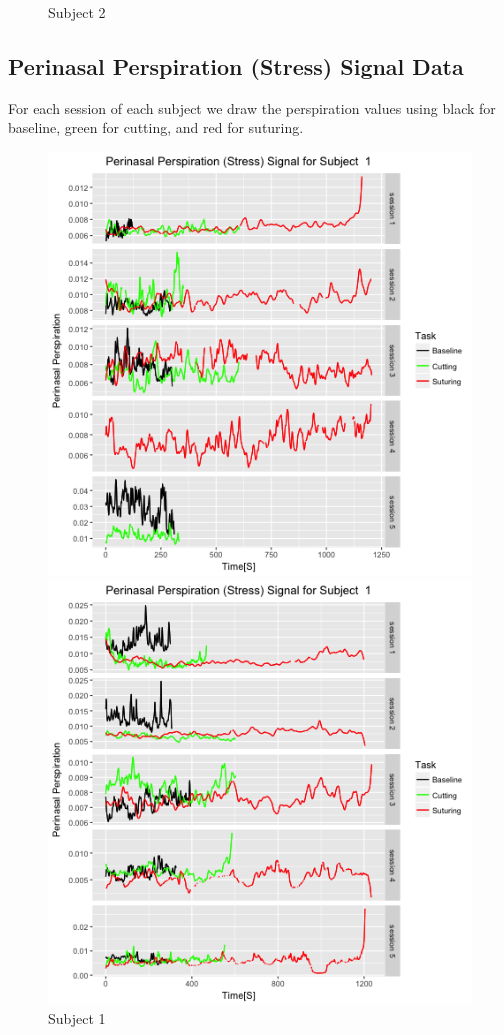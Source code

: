 \documentclass[12pt,epsf]{report}
\begin{document}
\begin{figure}[!ht]
\begin{minipage}[c]{0.5\linewidth}
	\caption{Subject 2}
	\end{minipage}
\end{figure}
\newpage
\subsection*{Perinasal Perspiration (Stress) Signal Data}
For each session of each subject  we draw the perspiration values using black for baseline, green for cutting, and red for suturing. 
\begin{figure}[!ht]
	\begin{minipage}[c]{0.5\linewidth}
	\includegraphics[width=\linewidth]{s1pp}
	\caption{Subject 1 }
	\end{minipage}
	\hfill
	\begin{minipage}[c]{0.5\linewidth}
	\includegraphics[width=\linewidth]{s2pp}

\end{minipage}
\end{figure}
\end{document}
